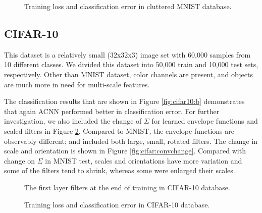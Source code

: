 \documentclass{bmvc2k}
\begin{document}
\begin{figure}
	\centering     %
	\caption{Training loss and classification error in cluttered MNIST database.}
	\label{fig:mnistclutteredplot}
\end{figure}

\subsection{CIFAR-10}

This dataset \cite{cifar10} is a relatively small (32x32x3) image set with 60,000 samples from 10 different classes. We divided this dataset into 50,000 train and 10,000 test sets, respectively. Other than MNIST dataset, color channels are present, and objects are much more in need for multi-scale features.

The classification results that are shown in Figure \ref{fig:cifar10:b} demonstrates that again ACNN performed better in classification error. For further investigation, we also included the change of $\Sigma$ for learned envelope functions and scaled filters in Figure \ref{fig:cifar10:filter1}. Compared to MNIST, the envelope functions are observably different; and included both large, small, rotated filters. The change in scale and orientation is shown in Figure \ref{fig:cifar:convchange}. Compared with change on $\Sigma$ in MNIST test, scales and orientations have more variation and some of the filters tend to shrink, whereas some were enlarged their scales.

\begin{figure}
	\centering
	\caption{The first layer filters at the end of training in CIFAR-10 database.}
	\label{fig:cifar10:filter1}
\end{figure}

\begin{figure}
	\centering     %
	
	
	\caption{Training loss and classification error in CIFAR-10 database.}
	\label{fig:cifar10:results}
\end{figure}
\end{document}

